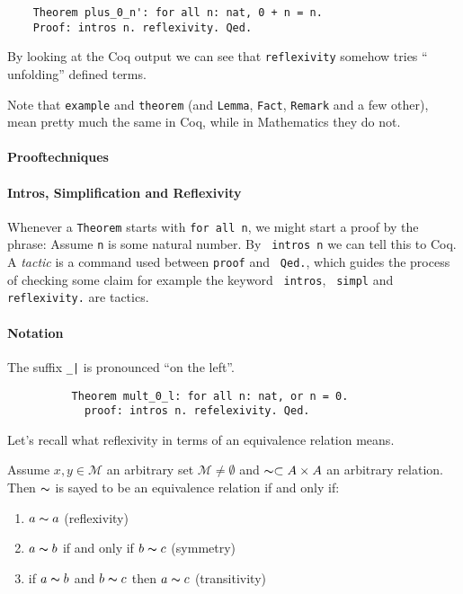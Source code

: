 	\begin{lstlisting}
    Theorem plus_0_n': for all n: nat, 0 + n = n.
    Proof: intros n. reflexivity. Qed.	
    \end{lstlisting}
    
    By looking at the Coq output we can see that \lstinline!reflexivity! somehow tries ``	unfolding'' defined terms.
    
    Note that \lstinline!example! and \lstinline!theorem! (and \lstinline!Lemma!, \lstinline!Fact!, \lstinline!Remark! and a few other),
    mean pretty much the same in Coq, while in Mathematics they do not.
    
   
     
    \paragraph{Prooftechniques}
    
    \paragraph{Intros, Simplification and Reflexivity}
     Whenever a \lstinline!Theorem! starts with \lstinline!for all n!, we might start a proof by the phrase:
     Assume \lstinline!n! is some natural number. By \lstinline! intros n! we can tell this to Coq.\\
     A {\itshape tactic} is a command used between \lstinline!proof! and \lstinline! Qed.!, 
     which guides the process of checking some claim for example the keyword \lstinline! intros!, \lstinline! simpl! and \lstinline!reflexivity.! 
     are tactics.
     \paragraph{Notation} 
     The suffix \lstinline!_|! is pronounced ``on the left''. 
     \begin{example}
	     \begin{lstlisting}
	      Theorem mult_0_l: for all n: nat, or n = 0.
	        proof: intros n. refelexivity. Qed.
	     \end{lstlisting}
     \end{example} 
  
   Let's recall what reflexivity in terms of an equivalence relation means.  
   \begin{definition}
   Assume $x,y\in \mathcal{M}$ an arbitrary set $\mathcal{M}\neq\emptyset$ and $\thicksim\subset A \times A $ an arbitrary relation.
   Then $\thicksim$ is sayed to be an equivalence relation if and only if:
   \begin{enumerate}
   \item $a\thicksim a$ (reflexivity)
   \item $a \thicksim b$ if and only if $b \thicksim c$ (symmetry)
   \item if $a \thicksim b$ and $ b\thicksim c$ then $a \thicksim c$ (transitivity) 
   \end{enumerate}
   \end{definition}
     
